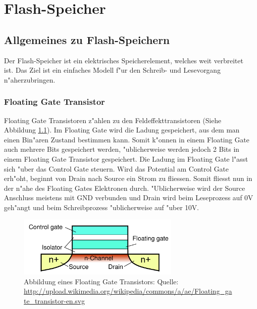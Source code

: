 \chapter{Flash-Speicher\label{chapter:flash}}
\begin{refsection}

\section{Allgemeines zu Flash-Speichern}
Der Flash-Speicher ist ein elektrisches Speicherelement, welches
weit verbreitet ist.
Das Ziel ist ein einfaches Modell f"ur den Schreib- und Lesevorgang
n"aherzubringen.

\subsection{Floating Gate Transistor}
Floating Gate Transistoren z"ahlen zu den Feldeffekttransistoren
(Siehe Abbildung \ref{skript:Floatinggatetransistor}).
Im Floating Gate wird die Ladung gespeichert, aus dem man einen Bin"aren
Zustand bestimmen kann.
Somit k"onnen in einem Floating Gate auch mehrere Bits gespeichert
werden, "ublicherweise werden jedoch 2 Bits in einem Floating Gate
Transistor gespeichert.
Die Ladung im Floating Gate l"asst sich "uber das Control Gate steuern.
Wird das Potential am Control Gate erh"oht, beginnt von Drain nach
Source ein Strom zu fliessen.
Somit fliesst nun in der n"ahe des Floating Gates Elektronen durch.
"Ublicherweise wird der Source Anschluss meistens mit GND verbunden und
Drain wird beim Leseprozess auf 0V geh"angt und beim Schreibprozess
"ublicherweise auf "uber 10V.

\begin{figure}
\centering
\includegraphics[width=0.7\textwidth]{flash/graphics/Floatinggate.pdf}
\caption{Abbildung eines Floating Gate Transistors: Quelle:
\url{http://upload.wikimedia.org/wikipedia/commons/a/ae/Floating_gate_transistor-en.svg}
\label{skript:Floatinggatetransistor}}
\end{figure}


\end{refsection}
